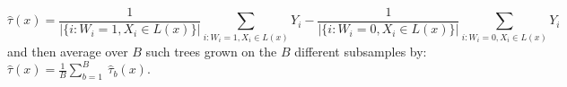 \[\hat{\tau}(x) = 
\frac{1}{|\{i:W_i = 1, X_i \in L(x)\}|}\sum_{i:W_i = 1, X_i \in L(x)}Y_i -
\frac{1}{|\{i:W_i = 0, X_i \in L(x)\}|}\sum_{i:W_i = 0, X_i \in L(x)}Y_i\]
and then average over \(B\) such trees grown on the \(B\) different subsamples by: 
\(\hat{\tau}(x) = \frac{1}{B}\sum_{b=1}^B\ \hat{\tau}_b(x)\).
